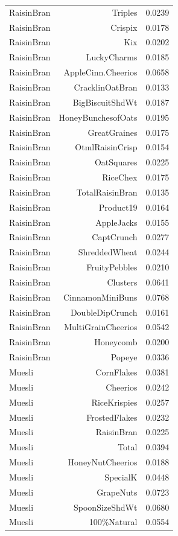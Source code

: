 \begin{longtable}{@{}lrr@{}}
RaisinBran & Triples & 0.0239 \\
RaisinBran & Crispix & 0.0178 \\
RaisinBran & Kix & 0.0202 \\
RaisinBran & LuckyCharms & 0.0185 \\
RaisinBran & AppleCinn.Cheerios & 0.0658 \\
RaisinBran & CracklinOatBran & 0.0133 \\
RaisinBran & BigBiscuitShdWt & 0.0187 \\
RaisinBran & HoneyBunchesofOats & 0.0195 \\
RaisinBran & GreatGraines & 0.0175 \\
RaisinBran & OtmlRaisinCrisp & 0.0154 \\
RaisinBran & OatSquares & 0.0225 \\
RaisinBran & RiceChex & 0.0175 \\
RaisinBran & TotalRaisinBran & 0.0135 \\
RaisinBran & Product19 & 0.0164 \\
RaisinBran & AppleJacks & 0.0155 \\
RaisinBran & CaptCrunch & 0.0277 \\
RaisinBran & ShreddedWheat & 0.0244 \\
RaisinBran & FruityPebbles & 0.0210 \\
RaisinBran & Clusters & 0.0641 \\
RaisinBran & CinnamonMiniBuns & 0.0768 \\
RaisinBran & DoubleDipCrunch & 0.0161 \\
RaisinBran & MultiGrainCheerios & 0.0542 \\
RaisinBran & Honeycomb & 0.0200 \\
RaisinBran & Popeye & 0.0336 \\
Muesli & CornFlakes & 0.0381 \\
Muesli & Cheerios & 0.0242 \\
Muesli & RiceKrispies & 0.0257 \\
Muesli & FrostedFlakes & 0.0232 \\
Muesli & RaisinBran & 0.0225 \\
Muesli & Total & 0.0394 \\
Muesli & HoneyNutCheerios & 0.0188 \\
Muesli & SpecialK & 0.0448 \\
Muesli & GrapeNuts & 0.0723 \\
Muesli & SpoonSizeShdWt & 0.0680 \\
Muesli & 100\%Natural & 0.0554 \\

\end{longtable}
